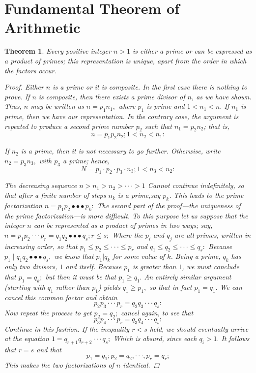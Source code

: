 \documentclass[12pt]{article}
\newtheorem{thm}{Theorem}[section]
\begin{document}
\section{Fundamental Theorem of Arithmetic}
\begin{thm}
\textit{Every positive integer $n>1$ is either a prime or can be expressed as a product of primes; this representation is unique, apart from the order in which the factors occur.}
\begin{proof}

Either $n$ is a prime or it is composite. In the first case there is nothing to prove. If $n$ is composite, then there exists a prime divisor of $n$, as we have shown. Thus, $n$ may be written as $n=p_1n_1,$ where $p_1$ is prime and $1<n_1<n.$ If $n_1$ is prime, then we have our representation. In the contrary case, the argument is repeated to produce a second prime number $p_2$ such that $n_1=p_2n_2$; that is,
$$
n=p_1p_2n_2; 1<n_2<n_1:
$$

 If $n_2$ is a prime, then it is not necessary to go further. Otherwise, write $n_2=p_3n_3,$ with $p_3$ a prime; hence,
$$
N=p_1\cdot p_2\cdot p_3\cdot n_3; 1<n_3<n_2:
$$

The decreasing sequence
$n>n_1>n_2>\cdot\cdot\cdot >1$
Cannot continue indefinitely, so that after a finite number of steps $n_k$ is a prime,say $p_k$. This leads to the prime factorization
$n=p_1 p_2∙∙∙ p_k:$
The second part of the proof—the uniqueness of the prime factorization—is more difficult. To this purpose let us suppose that the integer $n$ can be represented as a product of primes in two ways; say,
$n=p_1 p_2\cdot\cdot\cdot p_r=q_1q_2∙∙∙ q_s; r\leq s;$
Where the $p_i$ and $q_j$ are all primes, written in increasing order, so that
$p_1≤ p_2 \leq\cdot\cdot\cdot\leq p_r$ and $q_1\leq q_2 \leq\cdot\cdot\cdot\leq q_s:$
Because $p_1\mid q_1q_2∙∙∙ q_s,$ we know that $p_1|q_k$ for some value of $k$. Being a prime, $q_k$ has only two divisors, $1$ and itself. Because $p_1$ is greater than $1$, we must conclude that $p_1=q_k;$ but then it must be that $p_1\geq q_1.$ An entirely similar argument (starting with $q_1$ rather than $p_1$) yields $q_1\geq p_1,$ so that in fact $p_1=q_1.$ We can cancel this common factor and obtain
$$
p_2 p_3\cdot\cdot\cdot p_r=q_2q_3\cdot\cdot\cdot q_s:
$$
Now repeat the process to get $p_2=q_2;$ cancel again, to see that
$$
p_3 p_4\cdot\cdot\cdot p_r=q_3q_4\cdot\cdot\cdot q_s:
$$
Continue in this fashion. If the inequality $r <s$ held, we should eventually arrive at the equation
$1=q_{r+1}q_{r+2}\cdot\cdot\cdot q_s;$
Which is absurd, since each $q_i >1.$ It follows that $r=s$ and that
$$
p_1=q_1;p_2=q_2,\cdot\cdot\cdot , p_r=q_r;
$$
This makes the two factorizations of $n$ identical.
\end{proof}
\end{thm}
\end{document}

